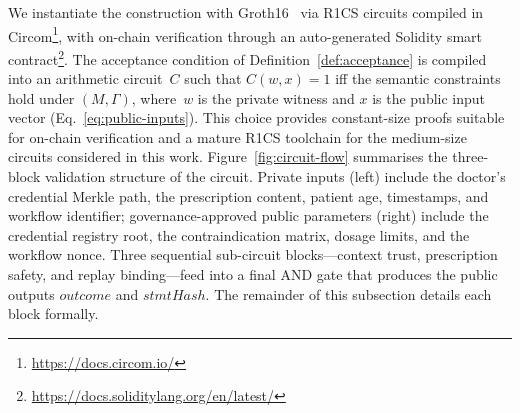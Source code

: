 \documentclass[journal]{IEEEtran}
\begin{document}
We instantiate the construction with Groth16~\cite{groth2016}
via R1CS circuits compiled in Circom\footnote{%
\url{https://docs.circom.io/}}, with on-chain verification
through an auto-generated Solidity smart contract\footnote{%
\url{https://docs.soliditylang.org/en/latest/}}.
The acceptance condition of Definition~\ref{def:acceptance}
is compiled into an arithmetic circuit~$C$ such that
$C(w,x)=1$ iff the semantic constraints hold under
$(M,\Gamma)$, where~$w$ is the private witness and $x$ is the
public input vector (Eq.~\ref{eq:public-inputs}).
This choice provides constant-size proofs suitable for
on-chain verification and a mature R1CS toolchain for the
medium-size circuits considered in this work.
Figure~\ref{fig:circuit-flow} summarises the three-block
validation structure of the circuit. Private inputs (left)
include the doctor's credential Merkle path, the prescription
content, patient age, timestamps, and workflow identifier;
governance-approved public parameters (right) include the
credential registry root, the contraindication matrix, dosage
limits, and the workflow nonce. Three sequential sub-circuit
blocks---context trust, prescription safety, and replay
binding---feed into a final AND gate that produces the
public outputs $\mathit{outcome}$ and $\mathit{stmtHash}$.
The remainder of this subsection details each block formally.
\end{document}
